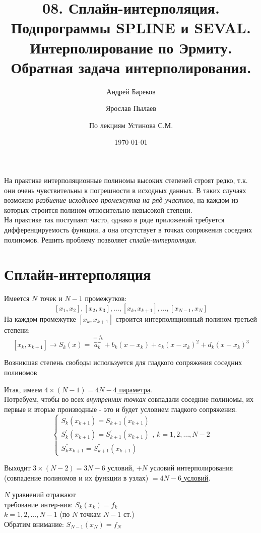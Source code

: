 \documentclass[a4paper,11pt]{article}
\title{08. Сплайн-интерполяция. Подпрограммы \textbf{SPLINE} и \textbf{SEVAL}. Интерполирование по Эрмиту. Обратная задача интерполирования.}
\author{Андрей Бареков \and Ярослав Пылаев \and По лекциям Устинова С.М.}
\date{\today}
\begin{document}
\maketitle
\newpage

На практике интерполяционные полиномы высоких степеней строят редко, т.к. они очень чувствительны к погрешности в исходных данных. В таких случаях возможно \textit{разбиение
  исходного промежутка на ряд участков}, на каждом из которых строится полином относительно невысокой степени. \\
  На практике так поступают часто, однако в ряде приложений
  требуется дифференцируемость функции, а она отсутствует в точках сопряжения соседних полиномов. Решить проблему позволяет \textit{сплайн-интерполяция}.

\section{Сплайн-интерполяция}
Имеется $N$ точек и $N-1$ промежутков:
\[[x_1, x_2], [x_2, x_3], \dots, [x_k, x_{k+1}], \dots, [x_{N-1}, x_N]\]
На каждом промежутке $[x_k, x_{k+1}]$ строится интерполяционный полином третьей степени:
\[[x_k, x_{k+1}] \rightarrow S_k(x) = \overbrace{a_k}^{=f_k} + b_k(x-x_k) + c_k(x-x_k)^2 + d_k(x-x_k)^3\]

\begin{center}
  \large{Возникшая степень свободы используется для гладкого сопряжения соседних полиномов} \\
\end{center}

Итак, имеем \underline{\(4 \times (N - 1) = 4N - 4\) параметра}. \\

Потребуем, чтобы во всех \textit{внутренних точках} совпадали соседние полиномы, их первые и вторые производные - это и будет условием гладкого сопряжения.
\begin{equation*}
  \begin{cases}
    S_k(x_{k+1}) = S_{k+1}(x_{k+1}) \\
    S^{'}_k(x_{k+1}) = S^{'}_{k+1}(x_{k+1}) \\
    S^{''}_k{x_{k+1}} = S^{''}_{k+1}(x_{k+1})
  \end{cases},\, k = 1, 2, \dots, N - 2
\end{equation*}

\begin{center}
  Выходит \(3 \times (N - 2) = 3N - 6\) условий, $+N$ условий интерполирования (совпадение полиномов и их функции в узлах) \underline{$=4N-6$ условий}.
\end{center}
\begin{flushright}
\footnotesize{
  $N$ уравнений отражают \\
  требование интер-ния:
  $S_k(x_k)=f_k$\\
  $k=1,2,...,N-1$ (по $N$ точкам $N-1$ ст.)\\
  Обратим внимание: $S_{N-1}(x_N)=f_N$
}
\end{flushright}
\end{document}
